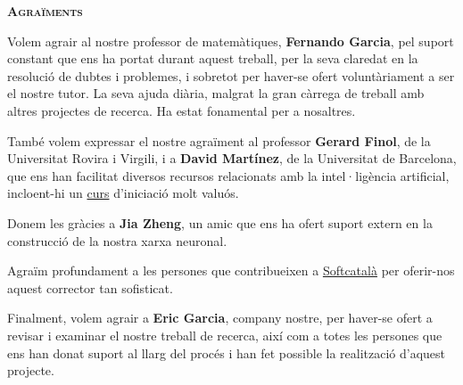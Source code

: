 \setlength{\parskip}{4pt}
\begin{modernquote}
\textsc{\textbf{Agraïments}}\par
{}
\raggedright
Volem agrair al nostre professor de matemàtiques, \textbf{Fernando Garcia}, pel suport constant que ens ha portat durant aquest treball, per la seva claredat en la resolució de dubtes i problemes, i sobretot per haver-se ofert voluntàriament a ser el nostre tutor. La seva ajuda diària, malgrat la gran càrrega de treball amb altres projectes de recerca. Ha estat fonamental per a nosaltres.\par

També volem expressar el nostre agraïment al professor \textbf{Gerard Finol}, de la Universitat Rovira i Virgili, i a \textbf{David Martínez}, de la Universitat de Barcelona, que ens han facilitat diversos recursos relacionats amb la intel·ligència artificial, incloent-hi un \href{https://www.coursera.org/specializations/deep-learning#courses}{curs} d’iniciació molt valuós.

Donem les gràcies a \textbf{Jia Zheng}, un amic que ens ha ofert suport extern en la construcció de la nostra xarxa neuronal.\par

Agraïm profundament a les persones que contribueixen a \href{https://www.softcatala.org/corrector/}{Softcatalà} per oferir-nos aquest corrector tan sofisticat.

Finalment, volem agrair a \textbf{Eric Garcia}, company nostre, per haver-se ofert a revisar i examinar el nostre treball de recerca, així com a totes les persones que ens han donat suport al llarg del procés i han fet possible la realització d’aquest projecte.
\end{modernquote}
\clearpage
